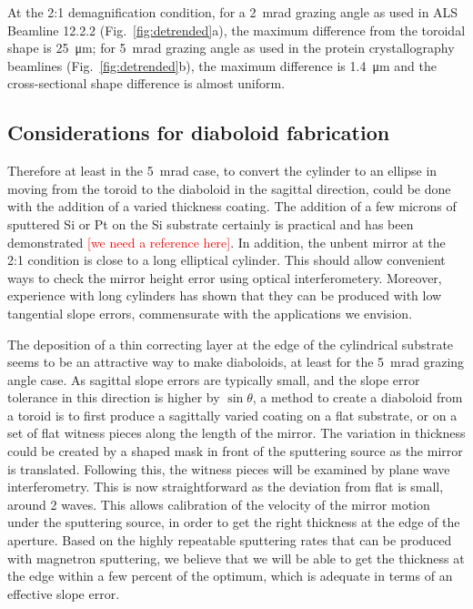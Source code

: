 \documentclass{iucr}       %
\begin{document}
At the 2:1 demagnification condition, for a \SI{2}{\milli\radian} grazing angle as used in ALS Beamline 12.2.2 (Fig.~\ref{fig:detrended}a), the maximum difference from the toroidal shape is \SI{25}{\micro\meter}; for \SI{5}{\milli\radian} grazing angle as used in the protein crystallography beamlines (Fig.~\ref{fig:detrended}b), the maximum difference is \SI{1.4}{\micro\meter} and the cross-sectional shape difference is almost uniform.

\subsection{Considerations for diaboloid fabrication}
Therefore at least in the \SI{5}{\milli\radian} case, to convert the cylinder to an ellipse in moving from the toroid to the diaboloid in the sagittal direction, could be done with the addition of a varied thickness coating. The addition of a few microns of sputtered Si or Pt on the Si substrate certainly is practical and has been demonstrated \textcolor{red}{[we need a reference here]}. In addition, the unbent mirror at the 2:1 condition is close to a long elliptical cylinder. This should allow convenient ways to check the mirror height error using optical interferometery. Moreover, experience with long cylinders has shown that they can be produced with low tangential slope errors, commensurate with the applications we envision. 

The deposition of a thin correcting layer at the edge of the cylindrical substrate seems to be an attractive way to make diaboloids, at least for the \SI{5}{\milli\radian} grazing angle case. As sagittal slope errors are typically small, and the slope error tolerance in this direction is higher by $\sin\theta$, a method to create a diaboloid from a toroid is to first produce a sagittally varied coating on a flat substrate, or on a set of flat witness pieces along the length of the mirror. The variation in thickness could be created by a shaped mask in front of the sputtering source as the mirror is translated. Following this, the witness pieces will be examined by plane wave interferometry. This is now straightforward as the deviation from flat is small, around 2 waves. This allows calibration of the velocity of the mirror motion under the sputtering source, in order to get the right thickness at the edge of the aperture. Based on the highly repeatable sputtering rates that can be produced with magnetron sputtering, we believe that we will be able to get the thickness at the edge within a few percent of the optimum, which is adequate in terms of an effective slope error. 
\end{document}
